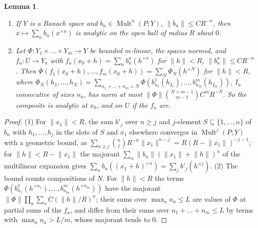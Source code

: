 \documentclass[11pt]{amsart}
\newtheorem{lemma}[theorem]{Lemma}
\theoremstyle{definition}
\theoremstyle{remark}
\numberwithin{equation}{section}
\newcommand{\Mult}{\operatorname{Mult}}
\newcommand{\norm}[1]{\lVert #1\rVert}
\theoremstyle{plain}
\theoremstyle{definition}
\theoremstyle{plain}
\begin{document}
\begin{lemma}\label{fmo:lem:series}
\begin{enumerate}
\item If $Y$ is a Banach space and $b_n\in\Mult^n(P;Y)$, $\norm{b_n}\le CR^{-n}$, then $x\mapsto\sum_nb_n(x^{\times n})$ is
analytic on the open ball of radius $R$ about $0$.
\item Let $\Phi\colon Y_1\times\dots\times Y_m\to Y$ be bounded $m$-linear, the spaces normed, and $f_a\colon U\to Y_a$ with
$f_a(x_0+h)=\sum_nb^a_n(h^{\times n})$ for $\norm h<R$, $\norm{b^a_n}\le CR^{-n}$. Then
$\Phi(f_1(x_0+h),\allowbreak\dots,f_m(x_0+h))=
\sum_N\Phi_N(h^{\times N})$ for $\norm h<R$, where
$\Phi_N(h_1,\dots,h_N)=\sum_{n_1+\dots+n_m=N}\Phi(b^1_{n_1}(h_{I_1}),\allowbreak\dots,
b^m_{n_m}(h_{I_m}))$, $I_a$ consecutive of sizes $n_a$, has norm at most $\norm\Phi\binom{N+m-1}{m-1}C^mR^{-N}$. So the
composite is analytic at $x_0$, and on $U$ if the $f_a$ are.
\end{enumerate}
\end{lemma}

\begin{proof}
(1) For $\norm{x_1}<R$, the sum $b'_j$ over $n\ge j$ and $j$-element $S\subseteq\{1,\dots,n\}$ of $b_n$ with
$h_1,\dots,h_j$ in the slots of $S$ and $x_1$ elsewhere converges in $\Mult^j(P;Y)$ with a geometric bound, as
$\sum_{n\ge j}\binom njR^{-n}\norm{x_1}^{n-j}=R(R-\norm{x_1})^{-j-1}$; for $\norm h<R-\norm{x_1}$ the majorant
$\sum_n\norm{b_n}(\norm{x_1}+\norm h)^n$ of the multilinear expansion gives $\sum_nb_n((x_1+h)^{\times n})=
\sum_jb'_j(h^{\times j})$.
(2) The bound counts compositions of $N$. For $\norm h<R$ the terms $\Phi(b^1_{n_1}(h^{\times n_1}),\dots,b^m_{n_m}(h^{\times
n_m}))$ have the majorant $\norm\Phi\prod_a\sum_nC(\norm h/R)^n$; their sums over $\max_an_a\le L$ are values of $\Phi$ at
partial sums of the $f_a$, and differ from their sums over $n_1+\dots+n_m\le L$ by terms with $\max_an_a>L/m$, whose
majorant tends to $0$.
\end{proof}
\end{document}
